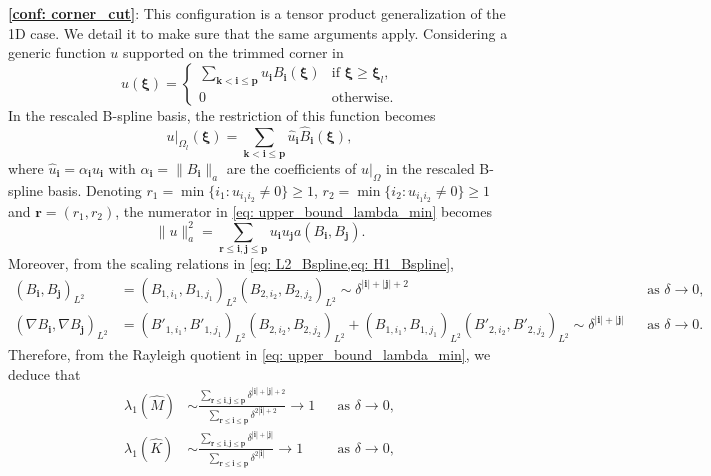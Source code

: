 \documentclass{article}
\numberwithin{equation}{section}
\newcommand{\restr}[2]{\left.{#1}\right|_{#2}}
\theoremstyle{definition}
\begin{document}
\noindent \textbf{\ref{conf: corner_cut}}:
This configuration is a tensor product generalization of the 1D case. We detail it to make sure that the same arguments apply. Considering a generic function $u$ supported on the trimmed corner in 
\begin{equation*}
    u(\bm{\xi}) =
    \begin{cases}
        \sum_{\bm{k} < \bm{i} \leq \bm{p}} u_{\bm{i}} B_{\bm{i}}(\bm{\xi}) & \text{if } \bm{\xi} \geq \bm{\xi}_{l}, \\
        0 & \text{otherwise}.
    \end{cases}
\end{equation*}
In the rescaled B-spline basis, the restriction of this function becomes
\begin{equation*}
    \restr{u}{\Omega_l}(\bm{\xi}) = \sum_{\bm{k} < \bm{i} \leq \bm{p}} \hat{u}_{\bm{i}} \hat{B}_{\bm{i}}(\bm{\xi}),
\end{equation*}
where $\hat{u}_{\bm{i}} = \alpha_{\bm{i}}u_{\bm{i}}$ with $\alpha_{\bm{i}}=\|B_{\bm{i}}\|_a$ are the coefficients of $\restr{u}{\Omega}$ in the rescaled B-spline basis. Denoting $r_1= \min \{i_1 \colon u_{i_1i_2} \neq 0\} \geq 1$, $r_2= \min \{i_2 \colon u_{i_1i_2} \neq 0\} \geq 1$ and $\bm{r}=(r_1,r_2)$, the numerator in \eqref{eq: upper_bound_lambda_min} becomes
\begin{equation*}
    \|u\|_a^2 = \sum_{\bm{r} \leq \bm{i},\bm{j} \leq \bm{p}}  u_{\bm{i}}u_{\bm{j}} a(B_{\bm{i}},B_{\bm{j}}).
\end{equation*}
Moreover, from the scaling relations in \cref{eq: L2_Bspline,eq: H1_Bspline},
\begin{align*}
    (B_{\bm{i}},B_{\bm{j}})_{L^2} &= (B_{1,i_1},B_{1,j_1})_{L^2}(B_{2,i_2},B_{2,j_2})_{L^2} \sim \delta^{|\bm{i}|+|\bm{j}|+2} & &\text{as } \delta \to 0, \\
    (\nabla B_{\bm{i}}, \nabla B_{\bm{j}})_{L^2} &= (B'_{1,i_1},B'_{1,j_1})_{L^2}(B_{2,i_2},B_{2,j_2})_{L^2}+(B_{1,i_1},B_{1,j_1})_{L^2}(B'_{2,i_2},B'_{2,j_2})_{L^2} \sim \delta^{|\bm{i}|+|\bm{j}|} & &\text{as } \delta \to 0.
\end{align*}
Therefore, from the Rayleigh quotient in \eqref{eq: upper_bound_lambda_min}, we deduce that
\begin{align*}
    \lambda_1(\hat{M}) &\sim \frac{\sum_{\bm{r} \leq \bm{i},\bm{j} \leq \bm{p}} \delta^{|\bm{i}|+|\bm{j}|+2}}{\sum_{\bm{r} \leq \bm{i} \leq \bm{p}} \delta^{2|\bm{i}|+2}} \to 1 & &\text{as } \delta \to 0, \\
    \lambda_1(\hat{K}) &\sim \frac{\sum_{\bm{r} \leq \bm{i},\bm{j} \leq \bm{p}} \delta^{|\bm{i}|+|\bm{j}|}}{\sum_{\bm{r} \leq \bm{i} \leq \bm{p}} \delta^{2|\bm{i}|}} \to 1 & &\text{as } \delta \to 0,
\end{align*}
\end{document}
